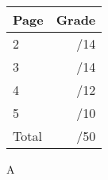 \documentclass[12pt]{article}
\newcommand{\skipline}{\vspace{12pt}}
\begin{document}
\begin{table}[hbt]
\begin{center}
\begin{tabular}{|l|r|} \hline
Page&Grade\\
\hline \hline
\cline{1-2} 2 & \enspace\enspace\enspace\enspace\enspace\enspace/14\\
\cline{1-2} 3 & \enspace\enspace\enspace\enspace\enspace\enspace/14\\
\cline{1-2} 4 & \enspace\enspace\enspace\enspace\enspace\enspace/12\\
\cline{1-2} 5 & \enspace\enspace\enspace\enspace\enspace\enspace/10\\
\cline{1-2} Total & \enspace\enspace\enspace\enspace\enspace\enspace/50\\
\hline
\end{tabular}

\skipline

\skipline

\skipline

A
\end{center}
\end{table}
\newpage
\end{document}
